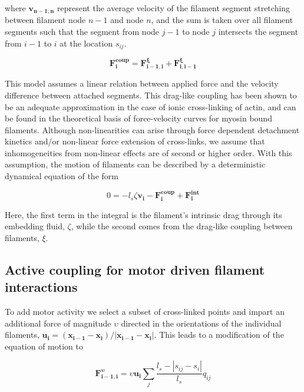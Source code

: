 \documentclass[10pt,letterpaper]{article}
\begin{document}
where $\mathbf{v_{n-1,n}}$ represent the average velocity of the filament segment stretching between filament node $n-1$ and node $n$, and the sum is taken over all filament segments such that the segment from node $j-1$ to node $j$ intersects the segment from $i-1$ to $i$ at the location $s_{ij}$.  

\begin{equation}
\label{eqn:drag}
\mathbf{F^{coup}_{i}} = \mathbf{F^{\xi}_{i-1,i}} + \mathbf{F^{\xi}_{i,i-1}} 
\end{equation}

This model assumes a linear relation between applied force and the velocity difference between attached segments.  This drag-like coupling has been shown to be an adequate approximation in the case of ionic cross-linking of actin\cite{mol_fric,theo_hydroish2}, and can be found in the theoretical basis of force-velocity curves for myosin bound filaments\cite{theo_frictionShila}. Although non-linearities can arise through force dependent detachment kinetics and/or non-linear force extension of cross-links, we assume that inhomogeneities from non-linear effects are of second or higher order. With this assumption, the motion of filaments can be described by a deterministic dynamical equation of the form

\begin{equation}
\label{eqn:syst1}
0 = -l_s\zeta\mathbf{ v_i} -\mathbf{F^{coup}_i}+ \mathbf{F^{int}_i}
\end{equation}

Here, the first term in the integral is the filament's intrinsic drag through its embedding fluid, $\zeta$, while the second comes from the drag-like coupling between filaments, $\xi$.  

\subsection*{Active coupling for motor driven filament interactions}

To add motor activity we select a subset of cross-linked points and impart an additional force of magnitude $\upsilon$ directed in the orientations of the individual filaments, $\mathbf{u_i}=(\mathbf{x_{i-1}}-\mathbf{x_{i}})/|\mathbf{x_{i-1}}-\mathbf{x_{i}}|$.  This leads to a modification of the equation of motion to

\begin{equation}
\label{eqn:moto}
\mathbf{F^{\upsilon}_{i-1,i}}=\upsilon \mathbf{u_i}\sum_j \frac{l_s-|s_{ij}-s_i|}{l_s}q_{ij}
\end{equation}
\end{document}
